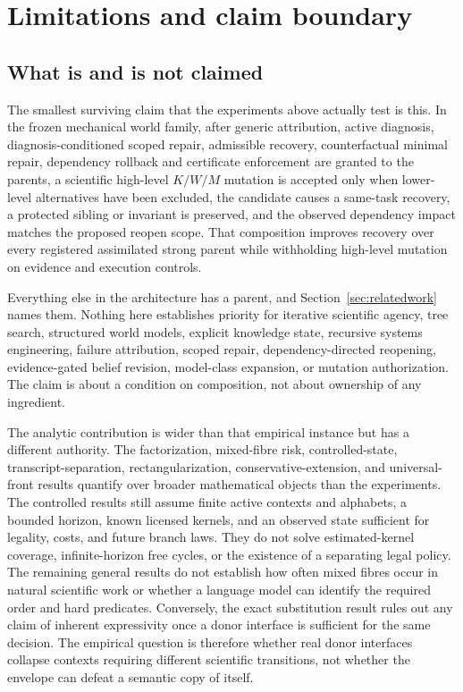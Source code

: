 \section{Limitations and claim boundary}
\label{sec:limitations}

\subsection{What is and is not claimed}

The smallest surviving claim that the experiments above actually test is this.
In the frozen mechanical world family, after generic attribution, active
diagnosis, diagnosis-conditioned scoped repair, admissible recovery,
counterfactual minimal repair, dependency rollback and certificate enforcement
are granted to the parents, a scientific high-level $K/W/M$ mutation is accepted
only when lower-level alternatives have been excluded, the candidate causes a
same-task recovery, a protected sibling or invariant is preserved, and the
observed dependency impact matches the proposed reopen scope. That composition
improves recovery over every registered assimilated strong parent while
withholding high-level mutation on evidence and execution controls.

Everything else in the architecture has a parent, and Section~\ref{sec:relatedwork}
names them. Nothing here establishes priority for iterative scientific agency,
tree search, structured world models, explicit knowledge state, recursive
systems engineering, failure attribution, scoped repair, dependency-directed
reopening, evidence-gated belief revision, model-class expansion, or mutation
authorization. The claim is about a condition on composition, not about
ownership of any ingredient.

The analytic contribution is wider than that empirical instance but has a
different authority. The factorization, mixed-fibre risk, controlled-state,
transcript-separation, rectangularization, conservative-extension, and
universal-front results quantify over broader mathematical objects than the
experiments. The controlled results still assume finite active contexts and
alphabets, a bounded horizon, known licensed kernels, and an observed state
sufficient for legality, costs, and future branch laws. They do not solve
estimated-kernel coverage, infinite-horizon free cycles, or the existence of a
separating legal policy. The remaining general results do not
establish how often mixed fibres occur in natural scientific work or whether a
language model can identify the required order and hard predicates. Conversely,
the exact substitution result rules out any claim of inherent expressivity once
a donor interface is sufficient for the same decision. The empirical question
is therefore whether real donor interfaces collapse contexts requiring
different scientific transitions, not whether the envelope can defeat a
semantic copy of itself.

